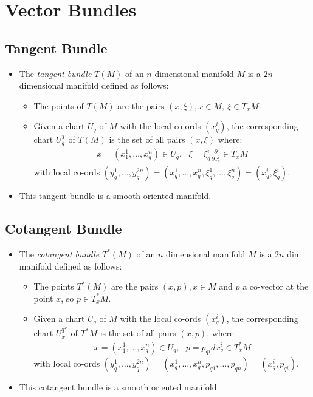 \documentclass[11pt]{article}
\numberwithin{equation}{section}
\begin{document}


\newpage 
\section{Vector Bundles} %
\label{sec:vector_bundles}
\subsection{Tangent Bundle} %
\label{sub:tangent_bundle}
\begin{itemize}
  \item The \emph{tangent bundle} $T(M)$ of an $n$ dimensional manifold $M$ is a $2n$ dimensional manifold defined as follows:
  \begin{itemize}
    \item The points of $T(M)$ are the pairs $(x,\xi), x \in M,~\xi \in T_{x}M$. 
    \item Given a chart $U_{q}$ of $M$ with the local co-ords $(x^i_{q})$, the corresponding chart $U^T_q$ of $T(M)$ is the set of all pairs $(x,\xi)$ where:
    \begin{align*}
       x = (x^{1}_1,\ldots,x^n_{q}) \in U_{q},~~~\xi = \xi^{i}_q\frac{\partial}{\partial x^i_q} \in T_xM
     \end{align*} 
     with local co-ords $(y^1_q,\ldots,y^{2n}_q) = (x^1_q,\ldots,x^n_q,\xi^1_q,\ldots,\xi^n_q) = (x^i_q,\xi^i_q)$.
  \end{itemize}
  \item This tangent bundle is a smooth oriented manifold. 
\end{itemize}

\subsection{Cotangent Bundle} %
\label{sub:cotangent_bundle}
\begin{itemize}
  \item The \emph{cotangent bundle} $T^{\ast}(M)$ of an $n$ dimensional manifold $M$ is a $2n$ dim manifold defined as follows:
  \begin{itemize}
    \item The points $T^{\ast}(M)$ are the pairs $(x,p), x \in M$ and $p$ a co-vector at the point $x$, so $p\in T^{\ast}_xM$. 
    \item Given a chart $U_{q} $ of $M$ with the local co-ords $(x^i_q)$, the corresponding chart $U^{T^{\ast}}_x$ of $T^{\ast}M$ is the set of all pairs $(x,p)$, where:
    \begin{align*}
    x = (x^{1}_1,\ldots,x^n_{q}) \in U_{q},~~~p = p_{qi}dx^i_q \in T^{\ast}_xM
    \end{align*}
    with local co-ords $(y^1_q,\ldots,y^{2n}_q) = (x^1_q,\ldots,x^n_q,p_{q1},\ldots,p_{qn}) = (x^i_q,p_{qi})$.
  \end{itemize}
  \item This cotangent bundle is a smooth oriented manifold. 
\end{itemize}
\end{document}
